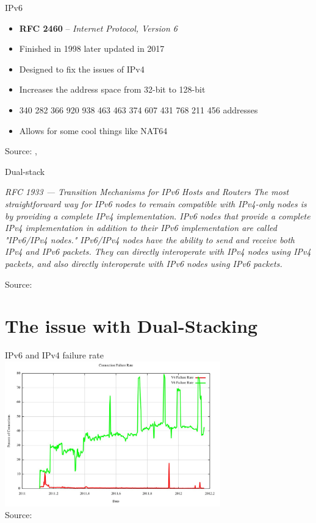 \documentclass[aspectratio=169]{beamer}
\begin{document}
\begin{frame}{IPv6}
  \begin{itemize}
    \item \textbf{RFC 2460} – \emph{Internet Protocol, Version 6}
    \item Finished in 1998 later updated in 2017
    \item Designed to fix the issues of IPv4
    \item Increases the address space from 32-bit to 128-bit
    \item 340 282 366 920 938 463 463 374 607 431 768 211 456 addresses
    \item Allows for some cool things like NAT64
  \end{itemize}
  \centering
  {\tiny Source: , }
\end{frame}

\begin{frame}{Dual-stack}
\small
\begin{block}{\textit{RFC 1933 — Transition Mechanisms for IPv6 Hosts and Routers}}
\vspace{0.5em}
\textit{The most straightforward way for IPv6 nodes to remain compatible with
IPv4-only nodes is by providing a complete IPv4 implementation. IPv6
nodes that provide a complete IPv4 implementation in addition to
their IPv6 implementation are called "IPv6/IPv4 nodes." IPv6/IPv4
nodes have the ability to send and receive both IPv4 and IPv6
packets. They can directly interoperate with IPv4 nodes using IPv4
packets, and also directly interoperate with IPv6 nodes using IPv6
packets.}
\end{block}
\centering
{\tiny Source: }
\end{frame}

\section{The issue with Dual-Stacking}
\begin{frame}{IPv6 and IPv4 failure rate}
  \centering
  \includegraphics[width=0.7\textwidth]{fig2.jpg}
  \\
  {\tiny Source: }
\end{frame}
\end{document}

